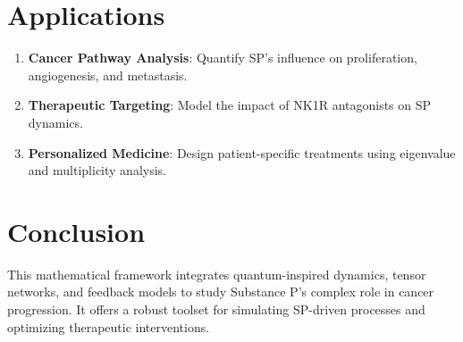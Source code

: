 \documentclass{article}
\begin{document}
\section{Applications}
\begin{enumerate}
    \item \textbf{Cancer Pathway Analysis}: Quantify SP’s influence on proliferation, angiogenesis, and metastasis.
    \item \textbf{Therapeutic Targeting}: Model the impact of NK1R antagonists on SP dynamics.
    \item \textbf{Personalized Medicine}: Design patient-specific treatments using eigenvalue and multiplicity analysis.
\end{enumerate}

\section*{Conclusion}
This mathematical framework integrates quantum-inspired dynamics, tensor networks, and feedback models to study Substance P's complex role in cancer progression. It offers a robust toolset for simulating SP-driven processes and optimizing therapeutic interventions.
\end{document}

